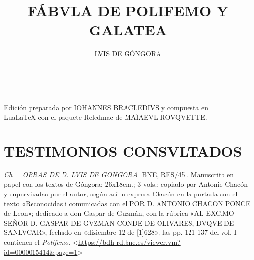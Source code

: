 \documentclass[11pt,a4paper,twoside]{article}
\title{FÁBVLA DE POLIFEMO Y GALATEA}
\author{\fontsize{14}{11.96}\selectfont LVIS DE GÓNGORA}
\date{\vspace{60pt}\fontsize{11}{11}\selectfont{TEXTO Y VARIANTES DE LA REDACCIÓN PRIMITIVA}\\\fontsize{40}{11}\selectfont{\vfill\LaTeX}}
\begin{document}
	{
			\maketitle
		}
		\newpage%

\hskip0pt
\vfill
\begin{flushright}
	Edición preparada por {\fontsize{9}{1}\selectfont IOHANNES BRACLEDIVS} y compuesta en\\ LuaLaTeX con el paquete Reledmac de {\fontsize{9}{11}\selectfont MAÏAEVL ROVQVETTE}.
\end{flushright}
\newpage
%
\tableofcontents
\newpage
%
\setcounter{page}{1}
\section*{\centering\fontsize{11}{14}\selectfont TESTIMONIOS CONSVLTADOS}

\emph{Ch} = \emph{\fontsize{9}{11}\selectfont OBRAS DE D. LVIS DE GONGORA} [BNE, RES/45].
%
Manuscrito en papel con los textos de Góngora; 26x18cm.; 3 vols.; copiado por Antonio Chacón y supervisadas por el autor, según así lo expresa Chacón en la portada con el texto «Reconocidas i comunicadas con el {\fontsize{9}{11}\selectfont POR D. ANTONIO CHACON PONCE} de Leon»; dedicado a don Gaspar de Guzmán, con la rúbrica «{\fontsize{9}{11}\selectfont AL EXC.MO SEÑOR D. GASPAR DE GVZMAN CONDE DE OLIVARES, DVQVE DE SANLVCAR}», fechado en «diziembre 12 de [1]628»; las pp. 121-137 del vol. I contienen el \emph{Polifemo}. <\url{https://bdh-rd.bne.es/viewer.vm?id=0000015414&page=1}>\par
\end{document}
